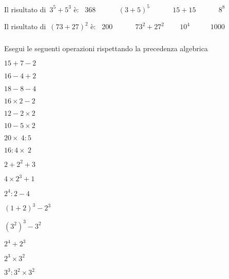 \begin{esercizio}
 Il risultato di~\(3^5+5^3\) è: \hfill
 ~368 ~~~~ ~\((3+5)^5\) ~~~~ 
~\(15+15\) ~~~~ ~\(8^8\)
 \end{esercizio}

\begin{esercizio}
 Il risultato di~\((73+27)^2\) è: \hfill
 ~200 ~~~~ ~\(73^2+27^2\) 
~~ ~\(10^4\) ~~~~~\(1000\)
\end{esercizio}


\subsubsection*{}

\begin{esercizio}
Esegui le seguenti operazioni rispettando la precedenza algebrica
 \begin{htmulticols}{4}
 \begin{enumeratees}
 \item \(15+7-2\)
 \item \(16-4+2\)
 \item \(18-8-4\)
 \item \(16\times 2-2\)
 \item \(12-2\times 2\)
 \item \(10-5\times 2\)
 \item \(20\times~4:5\)
 \item \(16:4\times~2\)
 \item \(2+2^2+3\)
 \item \(4\times 2^3+1\)
 \item \(2^4:2-4\)
 \item \((1+2)^3-2^3\)
 \item \((3^2)^3-3^2\)
 \item \(2^4+2^3\)
 \item \(2^3\times3^2\)
 \item \(3^3:3^2\times3^2\)
 \end{enumeratees}
 \end{htmulticols}
\end{esercizio}


